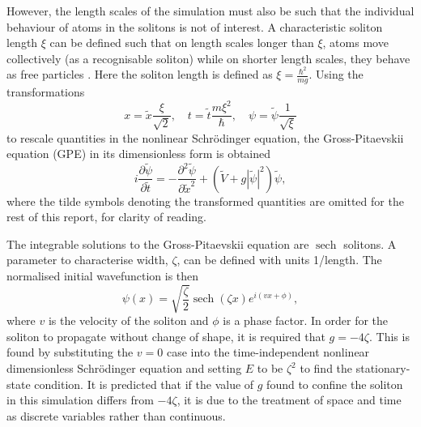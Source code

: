 \documentclass[10pt, twocolumn]{revtex4}    %
\DeclareMathOperator{\sech}{sech}		%
\begin{document}
However, the length scales of the simulation must also be such that the individual behaviour of atoms in the solitons is not of interest. A characteristic soliton length $\xi$ can be defined such that on length scales longer than $\xi$, atoms move collectively (as a recognisable soliton) while on shorter length scales, they behave as free particles \cite{}. Here the soliton length is defined as $\xi = \frac{\hbar^2}{mg}$. Using the transformations 
\begin{equation} \label{transforms}
x = \tilde{x} \frac{\xi}{\sqrt{2}}, \quad		 t = \tilde{t} \frac{m \xi^2}{\hbar}, 	\quad \psi = \tilde{\psi} \frac{1}{\sqrt{\xi}}
\end{equation}
to rescale quantities in the nonlinear Schr\"{o}dinger equation, the Gross-Pitaevskii equation (GPE) in its dimensionless form is obtained \cite{Gross} \cite{Pitaevskii}
\begin{equation} \label{GPE}
i \frac{\partial \tilde{\psi}}{\partial \tilde{t}} = -\frac{\partial^2 \tilde{\psi}}{\partial \tilde{x}^2} + (\tilde{V}+g |\tilde{\psi}|^2) \tilde{\psi},
\end{equation}
where the tilde symbols denoting the transformed quantities are omitted for the rest of this report, for clarity of reading. 

The integrable solutions to the Gross-Pitaevskii equation are $\sech$ solitons. A parameter to characterise width, $\zeta$, can be defined with units 1/length. The normalised initial wavefunction is then 
\begin{equation} \label{soliton}
\psi(x) = \sqrt{\frac{\zeta}{2}} \sech{(\zeta x)} e^{i (v x + \phi)},
\end{equation}
where $v$ is the velocity of the soliton and $\phi$ is a phase factor. In order for the soliton to propagate without change of shape, it is required that $g=-4\zeta$. This is found by substituting the $v=0$ case into the time-independent nonlinear dimensionless Schr\"{o}dinger equation and setting $E$ to be $\zeta^2$ to find the stationary-state condition. It is predicted that if the value of $g$ found to confine the soliton in this simulation differs from $-4\zeta$, it is due to the treatment of space and time as discrete variables rather than continuous. 
\end{document}
